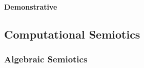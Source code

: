 \paragraph{Demonstrative}\label{sec:demonstrative}



\subsection{Computational Semiotics}\label{sec:computational_semiotics}

\subsubsection{Algebraic Semiotics}\label{sec:algebraic_semiotics}
